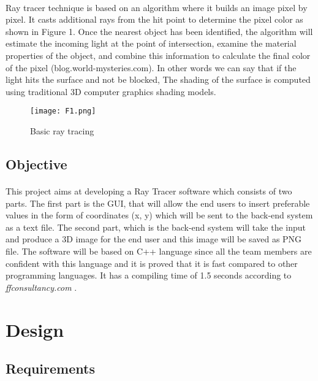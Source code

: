 \documentclass{article}
\begin{document}
\paragraph{}
Ray tracer technique is based on an algorithm where it builds an image pixel by pixel. It casts additional rays from the hit point to determine the pixel color as shown in Figure 1.
Once the nearest object has been identified, the algorithm will estimate the incoming light at the point of intersection, examine the material properties of the object, and combine this information to calculate the final color of the pixel (blog.world-mysteries.com). In other words we can say that if the light hits the surface and not be blocked,  The shading of the surface is computed using traditional 3D computer graphics shading models. 

\begin{figure}
    \centering
    \texttt{[image: F1.png]}
    \caption{Basic ray tracing}
    \label{figure1}
\end{figure}

\subsection{Objective}

\paragraph{}
This project aims at developing a Ray Tracer software which consists of two parts. The first part is the GUI, that will allow the end users to insert preferable values in the form of coordinates (x, y) which will be sent to the back-end system as a text file.
The second part, which is the back-end system will take the input and produce a 3D image for the end user and this image will be saved as PNG file. 
The software will be based on C++ language since all the team members are confident with this language and it is proved that it is fast compared to other programming languages. It has a compiling time of 1.5 seconds according to \textit{ffconsultancy.com }.


\section{Design}

\subsection{Requirements}
\end{document}
